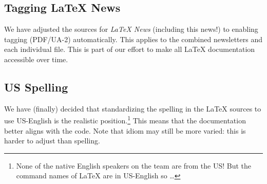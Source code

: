 \documentclass{ltnews}
\begin{document}
\subsection{Tagging \LaTeX{} News}

We have adjusted the sources for \emph{\LaTeX{} News} (including this
news!) to enabling tagging (PDF/UA-2) automatically. This applies to
the combined newsletters and each individual file. This is part of our
effort to make all \LaTeX{} documentation accessible over time.

\subsection{US Spelling}

We have (finally) decided that standardizing the spelling in the
\LaTeX{} sources to use US-English is the realistic
position.\footnote{None of the native English speakers on the team are
from the US! But the command names of \LaTeX{} are in US-English so
\ldots} This means that the documentation better aligns with the
code. Note that idiom may still be more varied: this is harder to
adjust than spelling.
\end{document}
